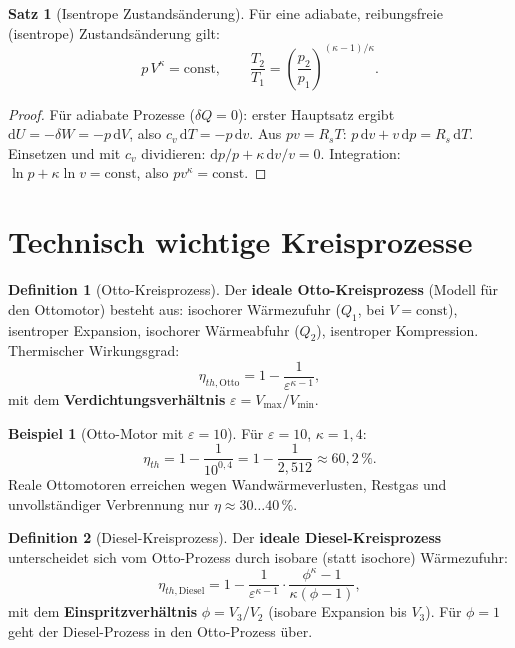﻿\documentclass[a4paper,12pt]{report}
\theoremstyle{definition}
\newtheorem{definition}{Definition}
\newtheorem{beispiel}{Beispiel}
\newtheorem{satz}{Satz}
\begin{document}
\begin{satz}[Isentrope Zustands\"anderung]
F\"ur eine adiabate, reibungsfreie (isentrope) Zustands\"anderung gilt:
\[
  p\,V^\kappa = \mathrm{const}, \qquad \frac{T_2}{T_1} = \left(\frac{p_2}{p_1}\right)^{(\kappa-1)/\kappa}.
\]
\end{satz}
\begin{proof}
F\"ur adiabate Prozesse ($\delta Q = 0$): erster Hauptsatz ergibt
$\mathrm{d}U = -\delta W = -p\,\mathrm{d}V$, also $c_v\,\mathrm{d}T = -p\,\mathrm{d}v$.
Aus $pv = R_sT$: $p\,\mathrm{d}v + v\,\mathrm{d}p = R_s\,\mathrm{d}T$.
Einsetzen und mit $c_v$ dividieren: $\mathrm{d}p/p + \kappa\,\mathrm{d}v/v = 0$.
Integration: $\ln p + \kappa\ln v = \mathrm{const}$, also $p v^\kappa = \mathrm{const}$.
\end{proof}

\section{Technisch wichtige Kreisprozesse}

\begin{definition}[Otto-Kreisprozess]
Der \textbf{ideale Otto-Kreisprozess} (Modell f\"ur den Ottomotor) besteht aus:
isochorer W\"armezufuhr ($Q_1$, bei $V = \mathrm{const}$),
isentroper Expansion,
isochorer W\"armeabfuhr ($Q_2$),
isentroper Kompression.
Thermischer Wirkungsgrad:
\[
  \eta_{th,\text{Otto}} = 1 - \frac{1}{\varepsilon^{\kappa-1}},
\]
mit dem \textbf{Verdichtungsverh\"altnis} $\varepsilon = V_{\max}/V_{\min}$.
\end{definition}

\begin{beispiel}[Otto-Motor mit $\varepsilon = 10$]
F\"ur $\varepsilon = 10$, $\kappa = 1{,}4$:
\[
  \eta_{th} = 1 - \frac{1}{10^{0{,}4}} = 1 - \frac{1}{2{,}512} \approx 60{,}2\,\%.
\]
Reale Ottomotoren erreichen wegen Wandw\"armeverlusten, Restgas und
unvollst\"andiger Verbrennung nur $\eta \approx 30\ldots40\,\%$.
\end{beispiel}

\begin{definition}[Diesel-Kreisprozess]
Der \textbf{ideale Diesel-Kreisprozess} unterscheidet sich vom Otto-Prozess
durch isobare (statt isochore) W\"armezufuhr:
\[
  \eta_{th,\text{Diesel}} = 1 - \frac{1}{\varepsilon^{\kappa-1}}\cdot\frac{\phi^\kappa - 1}{\kappa(\phi-1)},
\]
mit dem \textbf{Einspritzverh\"altnis} $\phi = V_3/V_2$ (isobare Expansion bis $V_3$).
F\"ur $\phi = 1$ geht der Diesel-Prozess in den Otto-Prozess \"uber.
\end{definition}
\end{document}
